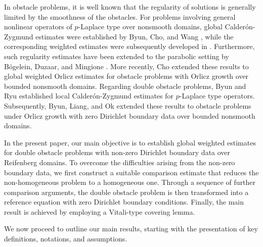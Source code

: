 \documentclass[10pt,a4paper]{article}
\theoremstyle{definition}
\numberwithin{equation}{section}
\begin{document}
In obstacle problems, it is well known that the regularity of solutions is generally limited by the smoothness of the obstacles. For problems involving general nonlinear operators of $p$-Laplace type over nonsmooth domains, global Calder\'on-Zygmund estimates were established by Byun, Cho, and Wang \cite{bcw}, while the corresponding weighted estimates were subsequently developed in \cite{bcp}. Furthermore, such regularity estimates have been extended to the parabolic setting by B{\"o}gelein, Duzaar, and Mingione \cite{bdm}. More recently, Cho \cite{cho} extended these results to global weighted Orlicz estimates for obstacle problems with Orlicz growth over bounded nonsmooth domains. Regarding double obstacle problems, Byun and Ryu \cite{br} established local Calder\'on-Zygmund estimates for $p$-Laplace type operators. Subsequently, Byun, Liang, and Ok \cite{blo} extended these results to obstacle problems under Orlicz growth with zero Dirichlet boundary data over bounded nonsmooth domains. 

In the present paper, our main objective is to establish global weighted estimates for double obstacle problems with non-zero Dirichlet boundary data over Reifenberg domains. To overcome the difficulties arising from the non-zero boundary data, we first construct a suitable comparison estimate that reduces the non-homogeneous problem to a homogeneous one. Through a sequence of further comparison arguments, the double obstacle problem is then transformed into a reference equation with zero Dirichlet boundary conditions. Finally, the main result is achieved by employing a Vitali-type covering lemma.
 

We now proceed to outline our main results, starting with the presentation of key definitions, notations, and assumptions.
\end{document}
